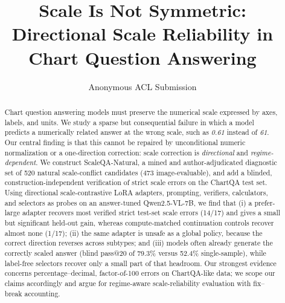 \documentclass[11pt]{article}
\title{Scale Is Not Symmetric: Directional Scale Reliability in Chart Question Answering}
\author{Anonymous ACL Submission}
\newcommand{\verify}[1]{{\color{red!70!black}#1}}
\begin{document}
\maketitle

\begin{abstract}
Chart question answering models must preserve the numerical scale expressed by axes, labels, and units. We study a sparse but consequential failure in which a model predicts a numerically related answer at the wrong scale, such as \textit{0.61} instead of \textit{61}. Our central finding is that this cannot be repaired by unconditional numeric normalization or a one-direction correction: scale correction is \emph{directional} and \emph{regime-dependent}. We construct ScaleQA-Natural, a mined and author-adjudicated diagnostic set of 520 natural scale-conflict candidates (473 image-evaluable), and add a blinded, construction-independent verification of strict scale errors on the ChartQA test set. Using directional scale-contrastive LoRA adapters, prompting, verifiers, calculators, and selectors as probes on an answer-tuned Qwen2.5-VL-7B, we find that (i) a prefer-large adapter recovers most verified strict test-set scale errors (\verify{14/17}) and gives a small but significant held-out gain, whereas compute-matched continuation controls recover almost none (\verify{1/17}); (ii) the same adapter is unsafe as a global policy, because the correct direction reverses across subtypes; and (iii) models often already generate the correctly scaled answer (blind pass@20 of \verify{79.3\%} versus \verify{52.4\%} single-sample), while label-free selectors recover only a small part of that headroom. Our strongest evidence concerns percentage--decimal, factor-of-100 errors on ChartQA-like data; we scope our claims accordingly and argue for regime-aware scale-reliability evaluation with fix--break accounting.
\end{abstract}








\clearpage




\appendix

\end{document}

